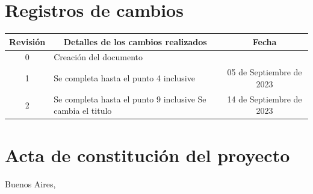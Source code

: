 \documentclass[
11pt, %
codirector, %
]{charter}
\begin{document}
\maketitle
\thispagestyle{empty}
\pagebreak


\thispagestyle{empty}
{\setlength{\parskip}{0pt}
	\tableofcontents{}
}
\pagebreak


\section*{Registros de cambios}
\label{sec:registro}


\begin{table}[ht]
	\label{tab:registro}
	\centering
	\begin{tabularx}{\linewidth}{@{}|c|X|c|@{}}
		\hline
		\rowcolor[HTML]{C0C0C0}
		Revisión            & \multicolumn{1}{c|}{\cellcolor[HTML]{C0C0C0}Detalles de los cambios realizados} & Fecha                    \\ \hline
		0                   & Creación del documento                                                          & \fechaInicioName         \\ \hline
		1                   & Se completa hasta el punto 4 inclusive                                          & 05 de Septiembre de 2023 \\ \hline
		2                   & Se completa hasta el punto 9 inclusive\newline
		Se cambia el titulo & 14 de Septiembre de 2023                                                                                   \\ \hline
	\end{tabularx}
\end{table}

\pagebreak


\section*{Acta de constitución del proyecto}
\label{sec:acta}

\begin{flushright}
	Buenos Aires, \fechaInicioName
\end{flushright}
\end{document}
